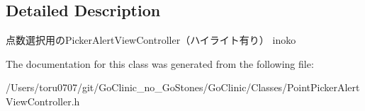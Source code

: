 \subsection{Detailed Description}
点数選択用のPickerAlertViewController（ハイライト有り）  inoko 

The documentation for this class was generated from the following file:\begin{DoxyCompactItemize}
\item 
/Users/toru0707/git/GoClinic\_\-no\_\-GoStones/GoClinic/Classes/PointPickerAlertViewController.h\end{DoxyCompactItemize}

